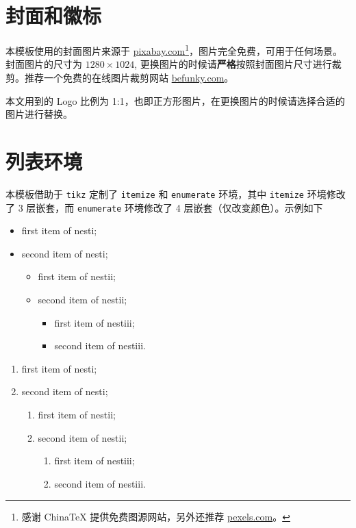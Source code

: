 \documentclass[cn,11pt]{elegantbook}
\begin{document}
\section{封面和徽标}

本模板使用的封面图片来源于 \href{https://pixabay.com/en/tea-time-poetry-coffee-reading-3240766/}{pixabay.com}\footnote{感谢 China\TeX{} 提供免费图源网站，另外还推荐 \href{https://www.pexels.com/}{pexels.com}。}，图片完全免费，可用于任何场景。封面图片的尺寸为 $1280 \times 1024$, 更换图片的时候请\textbf{严格}按照封面图片尺寸进行裁剪。推荐一个免费的在线图片裁剪网站 \href{https://www.befunky.com/create/crop-photo/}{befunky.com}。

本文用到的 Logo 比例为 1:1，也即正方形图片，在更换图片的时候请选择合适的图片进行替换。

\section{列表环境}
本模板借助于 \lstinline{tikz} 定制了 \lstinline{itemize} 和 \lstinline{enumerate} 环境，其中 \lstinline{itemize} 环境修改了 3 层嵌套，而 \lstinline{enumerate} 环境修改了 4 层嵌套（仅改变颜色）。示例如下\\[2ex]
\begin{minipage}[b]{0.49\textwidth}
\begin{itemize}
   \item first item of nesti;
   \item second item of nesti;
   \begin{itemize}
      \item first item of nestii;
      \item second item of nestii;
      \begin{itemize}
         \item first item of nestiii;
         \item second item of nestiii.
      \end{itemize}   
   \end{itemize}
\end{itemize}
\end{minipage}
\begin{minipage}[b]{0.49\textwidth}
\begin{enumerate}
   \item first item of nesti;
   \item second item of nesti;
   \begin{enumerate}
      \item first item of nestii;
      \item second item of nestii;
      \begin{enumerate}
         \item first item of nestiii;
         \item second item of nestiii.
      \end{enumerate}   
   \end{enumerate}
\end{enumerate}
\end{minipage}
\end{document}
